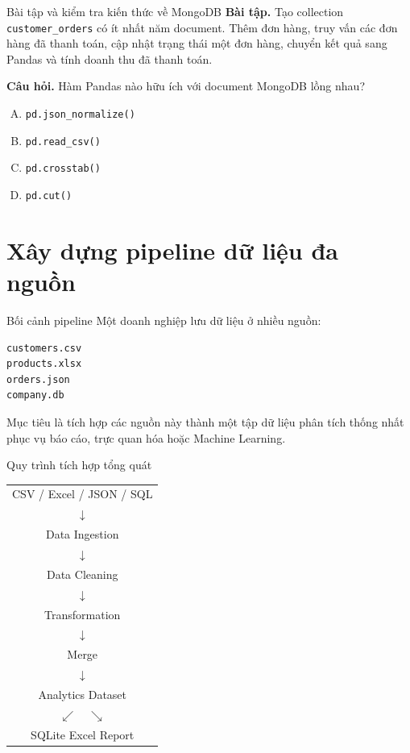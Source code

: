 \documentclass[aspectratio=169,11pt]{beamer}
\newcommand{\code}[1]{\texttt{#1}}
\newcommand{\smallgap}{\vspace{0.4em}}
\begin{document}
\begin{frame}{Bài tập và kiểm tra kiến thức về MongoDB}
\textbf{Bài tập.} Tạo collection \code{customer\_orders} có ít nhất năm document. Thêm đơn hàng, truy vấn các đơn hàng đã thanh toán, cập nhật trạng thái một đơn hàng, chuyển kết quả sang Pandas và tính doanh thu đã thanh toán.

\smallgap
\textbf{Câu hỏi.} Hàm Pandas nào hữu ích với document MongoDB lồng nhau?
\begin{enumerate}[A.]
  \item \code{pd.json\_normalize()}
  \item \code{pd.read\_csv()}
  \item \code{pd.crosstab()}
  \item \code{pd.cut()}
\end{enumerate}
\end{frame}

\section{Xây dựng pipeline dữ liệu đa nguồn}

\begin{frame}[fragile]{Bối cảnh pipeline}
Một doanh nghiệp lưu dữ liệu ở nhiều nguồn:
\begin{lstlisting}[style=textstyle]
customers.csv
products.xlsx
orders.json
company.db
\end{lstlisting}

Mục tiêu là tích hợp các nguồn này thành một tập dữ liệu phân tích thống nhất phục vụ báo cáo, trực quan hóa hoặc Machine Learning.
\end{frame}

\begin{frame}{Quy trình tích hợp tổng quát}
\begin{center}
\begin{tabular}{c}
CSV / Excel / JSON / SQL \\
$\downarrow$ \\
Data Ingestion \\
$\downarrow$ \\
Data Cleaning \\
$\downarrow$ \\
Transformation \\
$\downarrow$ \\
Merge \\
$\downarrow$ \\
Analytics Dataset \\
$\swarrow \quad \searrow$ \\
SQLite \qquad Excel Report
\end{tabular}
\end{center}
\end{frame}
\end{document}
